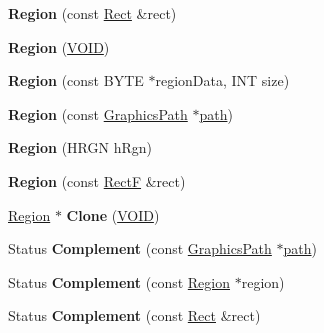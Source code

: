\begin{DoxyCompactItemize}
\item 
\mbox{\label{class_region_a73e247b13c91dd93ca69992986cdcd63}} 
{\bfseries Region} (const \hyperlink{struct_rect}{Rect} \&rect)
\item 
\mbox{\label{class_region_abea117d96a06e9251e1837bdd06ed803}} 
{\bfseries Region} (\hyperlink{interfacevoid}{V\+O\+ID})
\item 
\mbox{\label{class_region_a0de3ee254983b4b90e3ef7b4ed0f59e6}} 
{\bfseries Region} (const B\+Y\+TE $\ast$region\+Data, I\+NT size)
\item 
\mbox{\label{class_region_a702a49666a5d2fce0f6cccaf54042daa}} 
{\bfseries Region} (const \hyperlink{class_graphics_path}{Graphics\+Path} $\ast$\hyperlink{structpath}{path})
\item 
\mbox{\label{class_region_af54a19945786c2e62b02d2c004fb0e12}} 
{\bfseries Region} (H\+R\+GN h\+Rgn)
\item 
\mbox{\label{class_region_aa22eb768ef3bc5aa359659f659b0c37a}} 
{\bfseries Region} (const \hyperlink{struct_rect_f}{RectF} \&rect)
\item 
\mbox{\label{class_region_a4ab9eebee181cf45a9d4bfd84ae5027e}} 
\hyperlink{class_region}{Region} $\ast$ {\bfseries Clone} (\hyperlink{interfacevoid}{V\+O\+ID})
\item 
\mbox{\label{class_region_acf7268b94af487559152baa5d6995d18}} 
Status {\bfseries Complement} (const \hyperlink{class_graphics_path}{Graphics\+Path} $\ast$\hyperlink{structpath}{path})
\item 
\mbox{\label{class_region_acfc7c60c45d7be34991082dabd60ef90}} 
Status {\bfseries Complement} (const \hyperlink{class_region}{Region} $\ast$region)
\item 
\mbox{\label{class_region_ab12e8990ebac0ad5f17aea5e8dd83a56}} 
Status {\bfseries Complement} (const \hyperlink{struct_rect}{Rect} \&rect)
\item 
\mbox{\label{class_region_ab8c7d7028c6349a58d91e4014e42a00f}} 

\end{DoxyCompactItemize}
